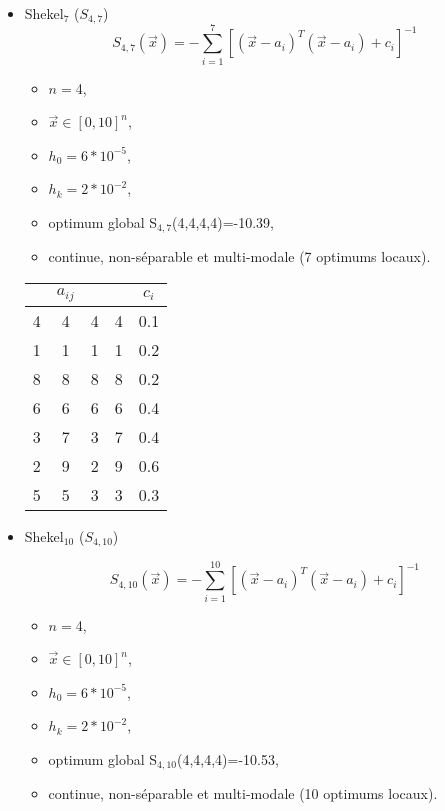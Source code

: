 \begin{itemize}
	\bigskip

	\item Shekel$_7$ ($S_{4,7}$)\\$$S_{4,7}(\overrightarrow{x})= -\sum_{i=1}^{7} [(\overrightarrow{x}-a_i)^T(\overrightarrow{x}-a_i)+c_i]^{-1}$$

	\begin{itemize}[label={$\circ$}]
		\item $n=$4, 
		\item $\overrightarrow{x} \in [0,10]^n$,
		\item $h_0=6*10^{-5}$,
		\item $h_k=2*10^{-2}$,
		\item optimum global S$_{4,7}$(4,4,4,4)=-10.39,
		\item continue, non-séparable et multi-modale (7 optimums locaux).
	\end{itemize}

	\bigskip

	\begin{table}[H]\centering
		\begin{tabular}{cccc|c}
			\toprule \textbf{} & \textbf{$a_{ij}$} & \textbf{} & \textbf{} & \textbf{$c_i$} \\    \midrule
			4 & 4 & 4 & 4 & 0.1    \\  
			1 & 1 & 1 & 1 & 0.2   \\ 
			8 & 8 & 8 & 8 & 0.2  \\
			6 & 6 & 6 & 6 & 0.4   \\ 
			3 & 7 & 3 & 7 & 0.4 \\ 
			2 & 9 & 2 & 9 & 0.6   \\ 
			5 & 5 & 3 & 3 & 0.3 \\ 
			\bottomrule	
		\end{tabular}
	\end{table}
	
	\bigskip
	\bigskip
	\bigskip
	\item Shekel$_{10}$ ($S_{4,10}$)
	
	\bigskip
	$$S_{4,10}(\overrightarrow{x})= -\sum_{i=1}^{10} [(\overrightarrow{x}-a_i)^T(\overrightarrow{x}-a_i)+c_i]^{-1}$$
	\begin{itemize}[label={$\circ$}]
		\item $n=$4, 
		\item $\overrightarrow{x} \in [0,10]^n$,
		\item $h_0=6*10^{-5}$,
		\item $h_k=2*10^{-2}$,
		\item optimum global S$_{4,10}$(4,4,4,4)=-10.53,
		\item continue, non-séparable et multi-modale (10 optimums locaux).
	\end{itemize}


\end{itemize}
